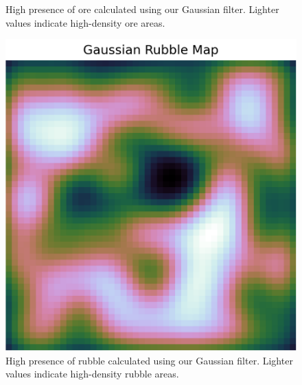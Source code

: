 \begin{figure}[htbp]
\begin{minipage}{0.32\textwidth}
        \captionsetup{justification=justified, singlelinecheck=false, width=1\linewidth, labelfont=bf} 
        \caption{High presence of ore calculated using our Gaussian filter. Lighter values indicate high-density ore areas.}
        \label{fig:gaussian-ore}
    \end{minipage}\hfill
    \begin{minipage}{0.32\textwidth}
        \centering
        \includegraphics[width=\linewidth]{images/methods_mono/factory_placement/gaussian_rubble_map.png}
        \captionsetup{justification=justified, singlelinecheck=false, width=1\linewidth, labelfont=bf} 
        \caption{High presence of rubble calculated using our Gaussian filter. Lighter values indicate high-density rubble areas.}
        \label{fig:gaussian-rubble}
    \end{minipage}
\end{figure}




